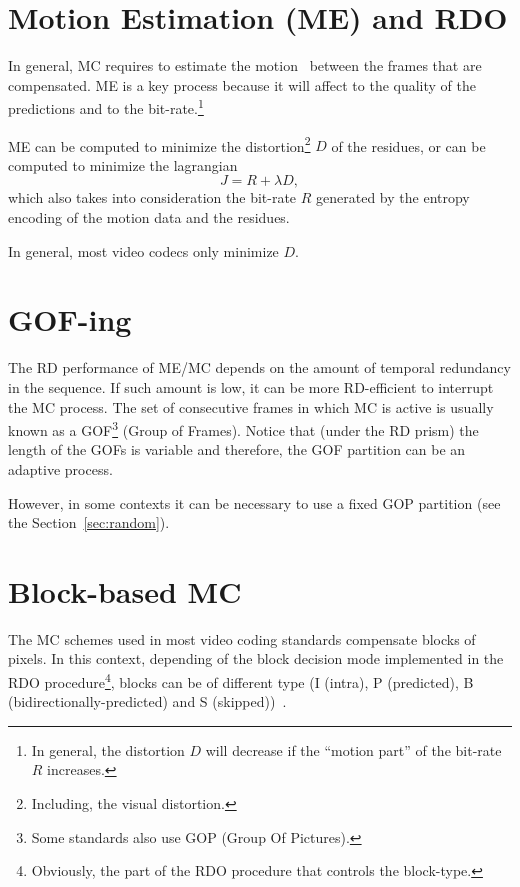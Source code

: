 
\section{Motion Estimation (ME) and RDO}

In general, MC requires to estimate the motion~\cite{vruiz__ME}
between the frames that are compensated. ME is a key process because
it will affect to the quality of the predictions and to the
bit-rate.\footnote{In general, the distortion $D$ will decrease if the
  ``motion part'' of the bit-rate $R$ increases.}

ME can be computed to minimize the distortion\footnote{Including, the
  visual distortion.} $D$ of the residues, or can be computed to
minimize the lagrangian
\begin{equation}
  J = R + \lambda D,
\end{equation}
which also takes into consideration the bit-rate $R$ generated by the
entropy encoding of the motion data and the residues.

In general, most video codecs only minimize $D$.


\section{GOF-ing}

The RD performance of ME/MC depends on the amount of temporal
redundancy in the sequence. If such amount is low, it can be more
RD-efficient to interrupt the MC process. The set of consecutive
frames in which MC is active is usually known as a GOF\footnote{Some
  standards also use GOP (Group Of Pictures).} (Group of
Frames). Notice that (under the RD prism) the length of the GOFs is
variable and therefore, the GOF partition can be an adaptive process.

However, in some contexts it can be necessary to use a fixed GOP
partition (see the Section~\ref{sec:random}).

\section{Block-based MC}

The MC schemes used in most video coding standards compensate blocks
of pixels. In this context, depending of the block decision mode
implemented in the RDO procedure\footnote{Obviously, the part of the
  RDO procedure that controls the block-type.}, blocks can be of
different type (I (intra), P (predicted), B
(bidirectionally-predicted) and S (skipped))~\cite{vruiz__MEC}.

